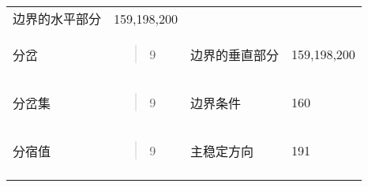 \documentclass{article}
\begin{document}
\begin{longtable}[]{@{}llll@{}}
\begin{minipage}[t]{0.22\columnwidth}
边界的水平部分\strut
\end{minipage} & \begin{minipage}[t]{0.22\columnwidth}\raggedright
159,198,200\strut
\end{minipage}\tabularnewline
\begin{minipage}[t]{0.22\columnwidth}\raggedright
分岔\strut
\end{minipage} & \begin{minipage}[t]{0.22\columnwidth}\raggedright
\begin{quote}
9
\end{quote}\strut
\end{minipage} & \begin{minipage}[t]{0.22\columnwidth}\raggedright
边界的垂直部分\strut
\end{minipage} & \begin{minipage}[t]{0.22\columnwidth}\raggedright
159,198,200\strut
\end{minipage}\tabularnewline
\begin{minipage}[t]{0.22\columnwidth}\raggedright
分岔集\strut
\end{minipage} & \begin{minipage}[t]{0.22\columnwidth}\raggedright
\begin{quote}
9
\end{quote}\strut
\end{minipage} & \begin{minipage}[t]{0.22\columnwidth}\raggedright
边界条件\strut
\end{minipage} & \begin{minipage}[t]{0.22\columnwidth}\raggedright
160\strut
\end{minipage}\tabularnewline
\begin{minipage}[t]{0.22\columnwidth}\raggedright
分宿值\strut
\end{minipage} & \begin{minipage}[t]{0.22\columnwidth}\raggedright
\begin{quote}
9
\end{quote}\strut
\end{minipage} & \begin{minipage}[t]{0.22\columnwidth}\raggedright
主稳定方向\strut
\end{minipage} & \begin{minipage}[t]{0.22\columnwidth}\raggedright
191\strut
\end{minipage}\tabularnewline
\begin{minipage}[t]{0.22\columnwidth}\raggedright

\end{minipage}
\end{longtable}
\end{document}

